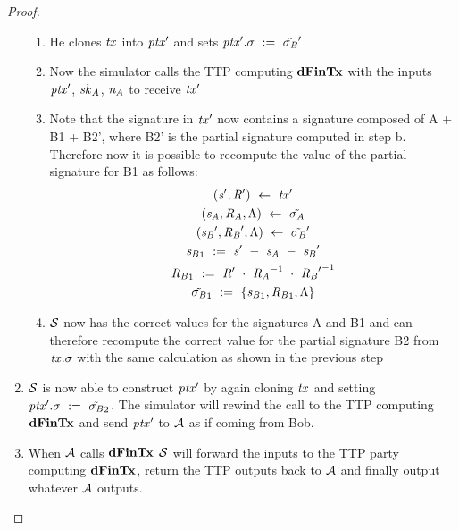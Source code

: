 \begin{proof}
\begin{enumerate}
\begin{enumerate}
            \item He clones $\mathit{tx}$ into ${\mathit{ptx}}'$ and sets ${\mathit{ptx}}'.\sigma ~:=~ {\tilde{\sigma_{\mathit{B}}}}'$
            \item Now the simulator calls the TTP computing $\mathbf{dFinTx}$ with the inputs ${\mathit{ptx}}'$, $\mathit{sk}_{\mathit{A}}$, $\mathit{\mathit{n}_{\mathit{A}}}$ to receive ${\mathit{tx}}'$
            \item Note that the signature in ${\mathit{tx}}'$ now contains a signature composed of A + B1 + B2', where B2' is the partial signature computed in step b.
            Therefore now it is possible to recompute the value of the partial signature for B1 as follows:
            \begin{gather*}
                ({\mathit{s}}', {\mathit{R}}') ~\leftarrow~ {\mathit{tx}}' \\
                (\mathit{s}_{\mathit{A}}, \mathit{R}_{\mathit{A}}, \Lambda) ~\leftarrow~ \tilde{\sigma_{\mathit{A}}} \\
                ({\mathit{s}_{\mathit{B}}}', {\mathit{R}_{\mathit{B}}}', \Lambda) ~\leftarrow~ {\tilde{\sigma_{\mathit{B}}}}' \\
                {\mathit{s}_{\mathit{B}}}_1 ~:=~ {\mathit{s}}' ~-~ \mathit{s}_{\mathit{A}} ~-~ {\mathit{s}_{\mathit{B}}}' \\
                {\mathit{R}_{\mathit{B}}}_1 ~:=~ {\mathit{R}}' ~\cdot~ {\mathit{R}_{\mathit{A}}}^{-1} ~\cdot~ {{\mathit{R}_{\mathit{B}}}'}^{-1} \\
                {\tilde{\sigma_{\mathit{B}}}}_1 ~:=~ \{ {\mathit{s}_{\mathit{B}}}_1, {\mathit{R}_{\mathit{B}}}_1, \Lambda \}
            \end{gather*}
            \item $\mathcal{S}$ now has the correct values for the signatures A and B1 and can therefore recompute the correct value for the partial signature B2 from $\mathit{tx}.\sigma$ with the same calculation as shown in the previous step
        \end{enumerate}
        \item $\mathcal{S}$ is now able to construct ${\mathit{ptx}}'$ by again cloning $\mathit{tx}$ and setting ${\mathit{ptx}}'.\sigma ~:=~ {\tilde{\sigma_{\mathit{B}}}}_2$.
        The simulator will rewind the call to the TTP computing $\mathbf{dFinTx}$ and send ${\mathit{ptx}}'$ to $\mathcal{A}$ as if coming from Bob.
        \item When $\mathcal{A}$ calls $\mathbf{dFinTx}$ $\mathcal{S}$ will forward the inputs to the TTP party computing $\mathbf{dFinTx}$, return the TTP outputs back to $\mathcal{A}$ and finally output whatever $\mathcal{A}$ outputs.
    \end{enumerate}


\end{proof}
